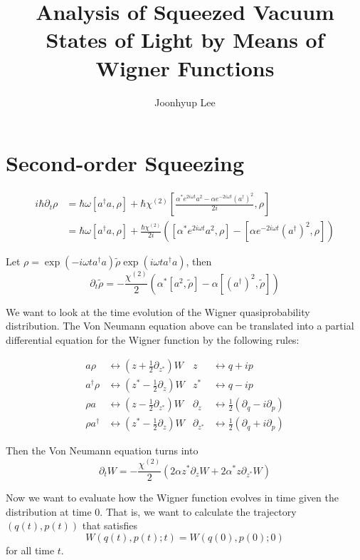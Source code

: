 \documentclass{article}
\title{Analysis of Squeezed Vacuum States of Light by Means of Wigner Functions}
\author{Joonhyup Lee}
\date{}
\begin{document}
\maketitle

\section{Second-order Squeezing}
\begin{align*}
  i\hbar\partial_{t}\rho & = \hbar\omega[a^{\dag}a, \rho]+\hbar\chi^{(2)}\left[\frac{\alpha^{*}e^{2i\omega t}a^{2}-\alpha e^{-2i\omega t}(a^{\dag})^{2}}{2i}, \rho\right] \\
                         & = \hbar\omega[a^{\dag}a, \rho]+\frac{\hbar\chi^{(2)}}{2i}([\alpha^{*}e^{2i\omega t}a^{2}, \rho]-[\alpha e^{-2i\omega t}(a^{\dag})^{2}, \rho])
\end{align*}

Let $\rho=\exp(-i\omega ta^{\dag}a)\tilde{\rho}\exp(i\omega ta^{\dag}a)$, then
\[\partial_{t}\tilde{\rho}=-\frac{\chi^{(2)}}{2}(\alpha^{*}[a^{2},\tilde{\rho}]-\alpha[(a^{\dag})^{2},\tilde{\rho}])\]

We want to look at the time evolution of the Wigner quasiprobability distribution.
The Von Neumann equation above can be translated into a partial differential equation for the Wigner function by the following rules:

\begin{align*}
  a\rho         & \leftrightarrow \left(z+\frac{1}{2}\partial_{z^{*}}\right)W & z                & \leftrightarrow q+ip                                    \\
  a^{\dag}\rho  & \leftrightarrow \left(z^{*}-\frac{1}{2}\partial_{z}\right)W & z^{*}            & \leftrightarrow q-ip                                    \\
  \rho a        & \leftrightarrow \left(z-\frac{1}{2}\partial_{z^{*}}\right)W & \partial_{z}     & \leftrightarrow \frac{1}{2}(\partial_{q}-i\partial_{p}) \\
  \rho a^{\dag} & \leftrightarrow \left(z^{*}-\frac{1}{2}\partial_{z}\right)W & \partial_{z^{*}} & \leftrightarrow \frac{1}{2}(\partial_{q}+i\partial_{p})
\end{align*}

Then the Von Neumann equation turns into
\[\partial_{t}W=-\frac{\chi^{(2)}}{2}(2\alpha z^{*}\partial_{z}W+2\alpha^{*}z\partial_{z^{*}}W)\]

Now we want to evaluate how the Wigner function evolves in time given the distribution at time $0$.
That is, we want to calculate the trajectory $(q(t), p(t))$ that satisfies
\[W(q(t),p(t);t)=W(q(0),p(0);0)\]
for all time $t$.
\end{document}
